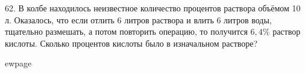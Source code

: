 62. В колбе находилось неизвестное количество процентов раствора объёмом 10 л. Оказалось, что
если отлить 6 литров раствора и влить 6 литров воды, тщательно размешать, а потом повторить
операцию, то получится $6,4\%$ раствор кислоты. Сколько процентов кислоты было в изначальном
растворе?

ewpage
